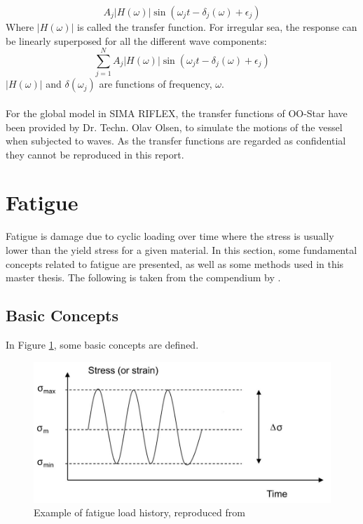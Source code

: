 \begin{equation}
    A_j |H(\omega)|\sin(\omega_jt-\delta_j(\omega)+\epsilon_j)
\end{equation}
Where $|H(\omega)|$ is called the transfer function. For irregular sea, the response can be linearly superposed for all the different wave components:
\begin{equation}
    \sum_{j=1}^N  A_j |H(\omega)|\sin(\omega_jt-\delta_j(\omega)+\epsilon_j)
\end{equation}
 $|H(\omega)|$ and $\delta(\omega_j)$ are functions of frequency, $\omega$.\\\\
For the global model in SIMA RIFLEX, the transfer functions of OO-Star have been provided by Dr. Techn. Olav Olsen, to simulate the motions of the vessel when subjected to waves. As the transfer functions are regarded as confidential they cannot be reproduced in this report.   

\section{Fatigue}
Fatigue is damage due to cyclic loading over time where the stress is usually lower than the yield stress for a given material. In this section, some fundamental concepts related to fatigue are presented, as well as some methods used in this master thesis. The following is taken from the compendium by \cite{fatigue2016}. 
\subsection{Basic Concepts}
In Figure \ref{fig:fatigue}, some basic concepts are defined. 

\begin{figure}[h!]
\centering
\includegraphics[scale=0.6]{figures/cycle}
\caption[$\; \:$Example of fatigue load history]{Example of fatigue load history, reproduced from  \cite{fatigue2016} }
 \label{fig:fatigue}
\end{figure}

